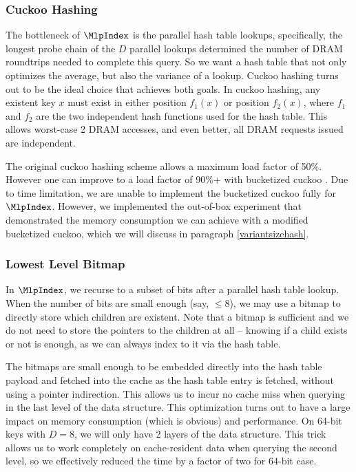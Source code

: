 \documentclass[11pt, usletter]{article}
\begin{document}
\subsubsection*{Cuckoo Hashing}

The bottleneck of $\MlpIndex$ is the parallel hash table lookups, 
specifically, the longest probe chain of the $D$ parallel lookups determined the number 
of DRAM roundtrips needed to complete this query. 
So we want a hash table that not only optimizes the average, but also the variance of a lookup. 
Cuckoo hashing \cite{cuckoohash} turns out to be the ideal choice that achieves both goals. 
In cuckoo hashing, any existent key $x$ must exist in either position $f_1(x)$ 
or position $f_2(x)$, where $f_1$ and $f_2$ are the two independent hash functions used for the hash table.
This allows worst-case 2 DRAM accesses, and even better, all DRAM requests issued are independent. 

The original cuckoo hashing scheme allows a maximum load factor of 50\%. 
However one can improve to a load factor of 90\%+ with bucketized cuckoo \cite{bucketcuckoo}. 
Due to time limitation, we are unable to implement the bucketized cuckoo fully for $\MlpIndex$. 
However, we implemented the out-of-box experiment that 
demonstrated the memory consumption we can achieve with a modified bucketized cuckoo, 
which we will discuss in paragraph \ref{variantsizehash}.

\subsubsection*{Lowest Level Bitmap} \label{lowestlevelbitmap}

In $\MlpIndex$, we recurse to a subset of bits after a parallel hash table lookup. 
When the number of bits are small enough (say, $\leq 8$), we may use a bitmap 
to directly store which children are existent. 
Note that a bitmap is sufficient and we do not need to store the pointers to the children at all -- 
knowing if a child exists or not is enough, as we can always index to it via the hash table.

The bitmaps are small enough to be embedded directly into the hash table payload 
and fetched into the cache as the hash table entry is fetched, without using a pointer indirection. 
This allows us to incur no cache miss when querying in the last level of the data structure. 
This optimization turns out to have a large impact on memory consumption (which is obvious) and performance. 
On 64-bit keys with $D=8$, we will only have 2 layers of the data structure. 
This trick allows us to work completely on cache-resident data when querying the second level, 
so we effectively reduced the time by a factor of two for 64-bit case.
\end{document}
